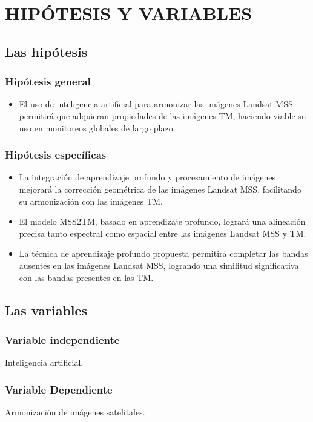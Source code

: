 \Chapter{}
\chapter{HIPÓTESIS Y VARIABLES}
    \section{Las hipótesis}
        \subsection{Hipótesis general}
            \begin{itemize}
                \item[-] El uso de inteligencia artificial para armonizar las imágenes Landsat MSS permitirá que adquieran propiedades de las imágenes TM, haciendo viable su uso en monitoreos globales de largo plazo
            \end{itemize}
        \subsection{Hipótesis específicas}
            \begin{itemize}
                \item[-] La integración de aprendizaje profundo y procesamiento de imágenes mejorará la corrección geométrica de las imágenes Landsat MSS, facilitando su armonización con las imágenes TM.
                \item[-] El modelo MSS2TM, basado en aprendizaje profundo, logrará una alineación precisa tanto espectral como espacial entre las imágenes Landsat MSS y TM.
                \item[-] La técnica de aprendizaje profundo propuesta permitirá completar las bandas ausentes en las imágenes Landsat MSS, logrando una similitud significativa con las bandas presentes en las TM.
            \end{itemize}
    \section{Las variables}
        \subsection{Variable independiente}
            Inteligencia artificial. %
        \subsection{Variable Dependiente}
            Armonización de imágenes satelitales. %

